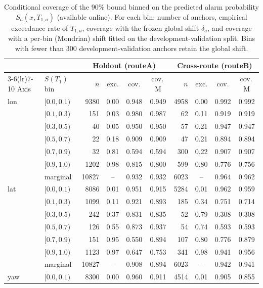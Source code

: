 \begin{table}[H]
\caption{Conditional coverage of the $90\%$ bound binned on the predicted alarm probability $S_a(x,T_{1,a})$ (available online). For each bin: number of anchors, empirical exceedance rate of $T_{1,a}$, coverage with the frozen global shift $\delta_a$, and coverage with a per-bin (Mondrian) shift fitted on the development-validation split. Bins with fewer than 300 development-validation anchors retain the global shift.}
\label{tab:condcov}
\centering
\footnotesize
\setlength{\tabcolsep}{2.2pt}
\begin{tabular}{llrcccrccc}
\toprule
 & & \multicolumn{4}{c}{Holdout (routeA)} & \multicolumn{4}{c}{Cross-route (routeB)} \\
\cmidrule(lr){3-6}\cmidrule(lr){7-10}
Axis & $S(T_1)$ bin & $n$ & exc. & cov. & cov.\,M & $n$ & exc. & cov. & cov.\,M \\
\midrule
lon & $[0.0,0.1)$ & 9380 & 0.00 & 0.948 & 0.949 & 4958 & 0.00 & 0.992 & 0.992 \\
 & $[0.1,0.3)$ & 151 & 0.03 & 0.980 & 0.987 & 62 & 0.11 & 0.919 & 0.919 \\
 & $[0.3,0.5)$ & 40 & 0.05 & 0.950 & 0.950 & 57 & 0.21 & 0.947 & 0.947 \\
 & $[0.5,0.7)$ & 22 & 0.18 & 0.909 & 0.909 & 47 & 0.21 & 0.894 & 0.894 \\
 & $[0.7,0.9)$ & 32 & 0.81 & 0.594 & 0.594 & 300 & 0.22 & 0.907 & 0.907 \\
 & $[0.9,1.0)$ & 1202 & 0.98 & 0.815 & 0.800 & 599 & 0.80 & 0.776 & 0.756 \\
 & marginal & 10827 & -- & 0.932 & 0.932 & 6023 & -- & 0.964 & 0.962 \\
\midrule
lat & $[0.0,0.1)$ & 8086 & 0.01 & 0.951 & 0.915 & 5284 & 0.01 & 0.962 & 0.959 \\
 & $[0.1,0.3)$ & 1099 & 0.11 & 0.921 & 0.893 & 185 & 0.34 & 0.751 & 0.714 \\
 & $[0.3,0.5)$ & 242 & 0.37 & 0.831 & 0.835 & 52 & 0.79 & 0.308 & 0.308 \\
 & $[0.5,0.7)$ & 126 & 0.55 & 0.873 & 0.937 & 54 & 0.74 & 0.593 & 0.593 \\
 & $[0.7,0.9)$ & 151 & 0.95 & 0.550 & 0.894 & 107 & 0.80 & 0.776 & 0.879 \\
 & $[0.9,1.0)$ & 1123 & 0.97 & 0.647 & 0.753 & 341 & 0.98 & 0.941 & 0.956 \\
 & marginal & 10827 & -- & 0.908 & 0.894 & 6023 & -- & 0.942 & 0.941 \\
\midrule
yaw & $[0.0,0.1)$ & 8300 & 0.00 & 0.960 & 0.911 & 4514 & 0.01 & 0.905 & 0.855 \\

\end{tabular}
\end{table}
